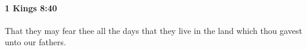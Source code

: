 
		\paragraph{1 Kings 8:40} %
			\label{1KINGS-8-40}

			That they may fear thee all the days that they live in the land which thou gavest unto our fathers.


